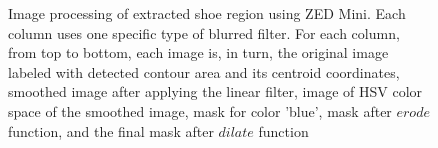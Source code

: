 \begin{figure}[H]

\caption{Image processing of extracted shoe region using ZED Mini. Each column uses one specific type of blurred filter. For each column, from top to bottom, each image is, in turn, the original image labeled with detected contour area and its centroid coordinates, smoothed image after applying the linear filter, image of HSV color space of the smoothed image, mask for color 'blue', mask after $erode$ function, and the final mask after $dilate$ function}
\label{zedfilter}
\end{figure}

